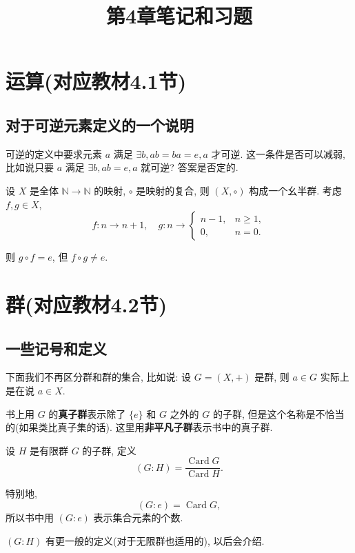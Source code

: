 \documentclass{ctexart}
\title{第4章笔记和习题}
\begin{document}
\maketitle
\section{运算(对应教材4.1节)}
\subsection{对于可逆元素定义的一个说明}
可逆的定义中要求元素 $a$ 满足 $\exists b,ab=ba=e,a$ 才可逆. 这一条件是否可以减弱, 比如说只要 $a$ 满足 $\exists b,ab=e,a$ 就可逆? 答案是否定的.

设 $X$ 是全体 $\mathbb{N}\to\mathbb{N}$ 的映射, $\circ$ 是映射的复合, 则 $(X,\circ)$ 构成一个幺半群. 考虑 $f,g\in X$,
\[f:n\to n+1,\quad g:n\to\begin{cases}
    n-1, & n\geq1, \\
    0, & n=0.
\end{cases}\]

则 $g\circ f=e$, 但 $f\circ g\neq e$.
\section{群(对应教材4.2节)}
\subsection{一些记号和定义}
下面我们不再区分群和群的集合, 比如说: 设 $G=(X,+)$ 是群, 则 $a\in G$ 实际上是在说 $a\in X$.

书上用 $G$ 的\textbf{真子群}表示除了 $\{e\}$ 和 $G$ 之外的 $G$ 的子群, 但是这个名称是不恰当的(如果类比真子集的话). 这里用\textbf{非平凡子群}表示书中的真子群.

设 $H$ 是有限群 $G$ 的子群, 定义
\[(G:H)=\dfrac{\operatorname{Card}G}{\operatorname{Card}H}.\]

特别地,
\[(G:e)=\operatorname{Card}G,\]
所以书中用 $(G:e)$ 表示集合元素的个数.

$(G:H)$ 有更一般的定义(对于无限群也适用的), 以后会介绍.
\end{document}

